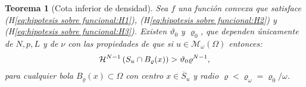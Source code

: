 \documentclass[a4paper,11pt,spanish, twoside, leqno]{tfm-uam}
\newtheorem{teo}{Teorema}[chapter]
\begin{document}
\begin{teo}[Cota inferior de densidad]\label{teo:Cota inferior de densidad} 
Sea $f$ una función convexa que satisface (H\ref{eq:hipotesis sobre funcional:H1}), (H\ref{eq:hipotesis sobre funcional:H2}) y (H\ref{eq:hipotesis sobre funcional:H3}). Existen $\vartheta_{0}$ y $\varrho_{0}$, que dependen únicamente de $N,p,L$ y de $\nu$ con las propiedades de que si $u\in \mathcal{M}_{\omega}(\Omega)$ entonces:
\begin{align}\label{teo:Cota inferior de densidad:eq:1}
\mathcal{H}^{N-1}\left (S_{u}\cap B_{\varrho}(x)\right )>\vartheta_{0}\varrho^{N-1},
\end{align}
para cualquier bola $B_{\varrho}(x)\subset \Omega$ con centro $x\in \overline{S}_{u}$ y radio $\varrho<\varrho_{\omega}=\varrho_{0}/\omega$.
\end{teo}
\end{document}
